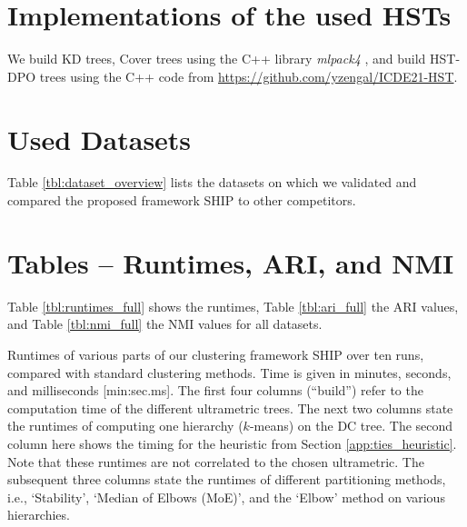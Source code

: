 \newpage
\section{Implementations of the used HSTs}
\label{app:experiments}

We build KD trees, Cover trees using the C++ library \emph{mlpack4} \citep{mlpack}, and build HST-DPO trees using the C++ code from \url{https://github.com/yzengal/ICDE21-HST}.


\section{Used Datasets}
Table \ref{tbl:dataset_overview} lists the datasets on which we validated and compared the proposed framework SHIP to other competitors.

\section{Tables -- Runtimes, ARI, and NMI}
Table \ref{tbl:runtimes_full} shows the runtimes, Table \ref{tbl:ari_full} the ARI values, and Table \ref{tbl:nmi_full} the NMI values for all datasets. 





\newpage

\begin{largetable}[htb]
    \centering
    \caption{
        Runtimes of various parts of our clustering framework SHIP over ten runs, compared with standard clustering methods. 
        Time is given in minutes, seconds, and milliseconds [min:sec.ms]. 
        The first four columns (``build'') refer to the computation time of the different ultrametric trees. The next two columns state the runtimes of computing one hierarchy ($k$-means) on the DC tree. The second column here shows the timing for the heuristic from Section \ref{app:ties_heuristic}.
        Note that these runtimes are not correlated to the chosen ultrametric.
        The subsequent three columns state the runtimes of different partitioning methods, i.e., `Stability', `Median of Elbows (MoE)', and the `Elbow' method on various hierarchies.
    }
    \label{tbl:runtimes_full}
    \vspace*{0.5em}
    \renewcommand{\arraystretch}{1.2}
    
    \renewcommand{\arraystretch}{1}
\end{largetable}




